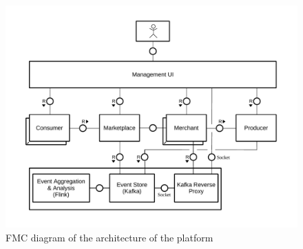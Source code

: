 \begin{figure}
	\centering
	\includegraphics[width=\textwidth]{figures/pricewars-architecture}
	\caption[\pricewars Architecture]
	{FMC diagram of the architecture of the \pricewars platform}
	\label{fig:platform_architecture}
\end{figure}

